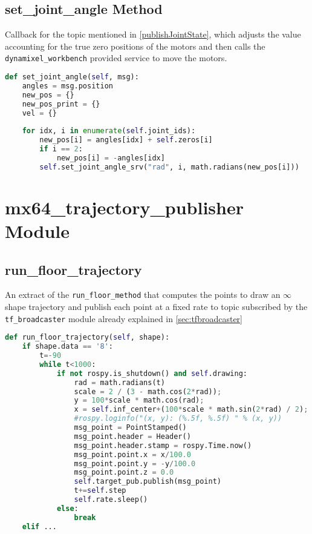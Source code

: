\subsection*{set\_joint\_angle Method}
Callback for the topic mentioned in \ref{publishJointState}, which adjusts the value accounting for the true zero positions of the motors and then calls the \texttt{dynamixel\_workbench} provided service to move the motors.
\begin{lstlisting}[caption={Set Joint Angle},label={lst:setjointangle},language=Python]
def set_joint_angle(self, msg):
    angles = msg.position
    new_pos = {}
    new_pos_print = {}
    vel = {}
    
    for idx, i in enumerate(self.joint_ids):
        new_pos[i] = angles[idx] + self.zeros[i]
        if i == 2:
            new_pos[i] = -angles[idx]
        self.set_joint_angle_srv("rad", i, math.radians(new_pos[i]))
\end{lstlisting}
\section*{mx64\_trajectory\_publisher Module}
\subsection*{run\_floor\_trajectory}
An extract of the \texttt{run\_floor\_method} that computes the points to draw an $\infty$ shape trajectory and publish each point at a fixed rate to topic subscribed by the \texttt{tf\_broadcaster} module already explained in \ref{sec:tfbroadcaster}
\begin{lstlisting}[caption={Run $\infty$ Trajectory},label={lst:runfloortrajectory},language=Python]
def run_floor_trajectory(self, shape):
    if shape.data == '8':
        t=-90
        while t<1000:
            if not rospy.is_shutdown() and self.drawing:
                rad = math.radians(t)
                scale = 2 / (3 - math.cos(2*rad));
                y = 100*scale * math.cos(rad);
                x = self.inf_center+(100*scale * math.sin(2*rad) / 2);
                #rospy.loginfo("(x, y): (%.5f, %.5f) " % (x, y))
                msg_point = PointStamped()
                msg_point.header = Header()
                msg_point.header.stamp = rospy.Time.now()
                msg_point.point.x = x/100.0
                msg_point.point.y = -y/100.0
                msg_point.point.z = 0.0
                self.target_pub.publish(msg_point)
                t+=self.step
                self.rate.sleep()
            else:
                break
    elif ...
\end{lstlisting}
